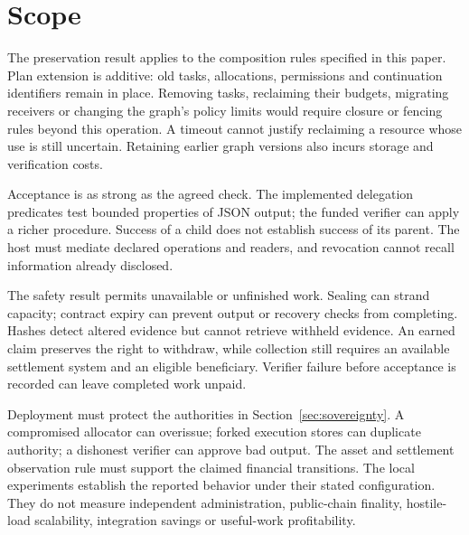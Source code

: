 \section{Scope}
\label{sec:scope}
The preservation result applies to the composition rules specified in this
paper. Plan extension is additive: old tasks, allocations, permissions and
continuation identifiers remain in place. Removing tasks, reclaiming their budgets, migrating
receivers or changing the graph's policy limits would require closure or fencing
rules beyond this operation. A timeout cannot justify reclaiming a resource
whose use is still uncertain. Retaining earlier graph versions also incurs
storage and verification costs.

Acceptance is as strong as the agreed check. The implemented delegation
predicates test bounded properties of JSON output; the funded verifier can
apply a richer procedure. Success of a child does not establish success of its
parent. The host must mediate declared operations and readers, and revocation
cannot recall information already disclosed.

The safety result permits unavailable or unfinished work. Sealing can strand
capacity; contract expiry can prevent output or recovery checks from completing.
Hashes detect altered evidence but cannot retrieve withheld evidence. An earned
claim preserves the right to withdraw, while collection still requires an
available settlement system and an eligible beneficiary. Verifier failure before
acceptance is recorded can leave completed work unpaid.

Deployment must protect the authorities in Section~\ref{sec:sovereignty}.
A compromised allocator can overissue; forked execution stores can duplicate
authority; a dishonest verifier can approve bad output. The asset and settlement
observation rule must support the claimed financial transitions. The local
experiments establish the reported behavior under their stated configuration.
They do not measure independent administration, public-chain finality,
hostile-load scalability, integration savings or useful-work profitability.
